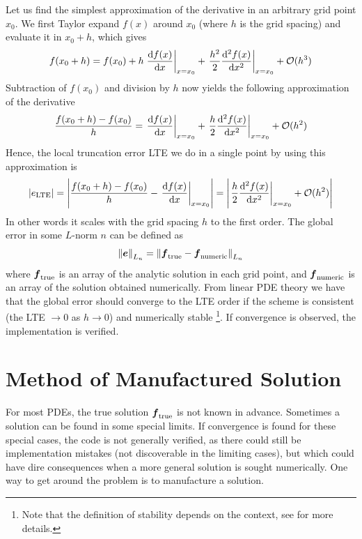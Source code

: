 Let us find the simplest approximation of the derivative in an arbitrary grid point $x_0$.
We first Taylor expand $f(x)$ around $x_0$ (where $h$ is the grid spacing) and evaluate it in $x_0 + h$, which gives
%
\begin{align*}
    f(x_0+h)
    = f(x_0)
    + h \left.\frac{\text{d}{f(x)}}{\text{d}{x}}\right|_{x=x_0}
    + \left.\frac{h^2}{2}\frac{\text{d}{^2f(x)}}{\text{d}{x^2}}\right|_{x=x_0}
    + \mathcal{O}(h^3)
\end{align*}
%
Subtraction of $f(x_0)$ and division by $h$ now yields the following approximation of the derivative
%
\begin{align*}
    \frac{f(x_0+h) - f(x_0)}{h}
    =  \left.\frac{\text{d}{f(x)}}{\text{d}{x}}\right|_{x=x_0}
    + \left.\frac{h}{2}\frac{\text{d}{^2f(x)}}{\text{d}{x^2}}\right|_{x=x_0}
    + \mathcal{O}(h^2)
\end{align*}
%
Hence, the local truncation error LTE we do in a single point by using this approximation is
%
\begin{align*}
    |e_{\text{LTE}}|
    =
    \left|\frac{f(x_0+h) - f(x_0)}{h} - \left.\frac{\text{d}{f(x)}}{\text{d}{x}}\right|_{x=x_0}\right|
    =
    \left| \left.\frac{h}{2}\frac{\text{d}{^2f(x)}}{\text{d}{x^2}}\right|_{x=x_0}
    + \mathcal{O}(h^2)\right|
\end{align*}
%
In other words it scales with the grid spacing $h$ to the first order.
The global error in some $L$-norm $n$ can be defined as
%
\begin{align*}
    \left\|\boldsymbol{e}\right\|_{L_n} =
    \left\|\boldsymbol{f}_{\text{true}} - \boldsymbol{f}_{\text{numeric}}\right\|_{L_n}
\end{align*}
%
where $\boldsymbol{f}_{\text{true}}$ is an array of the analytic solution in each grid point, and $\boldsymbol{f}_{\text{numeric}}$ is an array of the solution obtained numerically.
From linear PDE theory we have that the global error should converge to the LTE order if the scheme is consistent (the LTE $\to 0$ as $h\to 0$) and numerically stable%
\footnote{Note that the definition of stability depends on the context, see \cite{Leveque2007book} for more details.}.
%
If convergence is observed, the implementation is verified.

\section{Method of Manufactured Solution}
\label{sec:MMS}
For most PDEs, the true solution $\boldsymbol{f}_{\text{true}}$ is not known in advance.
Sometimes a solution can be found in some special limits.
If convergence is found for these special cases, the code is not generally verified, as there could still be implementation mistakes (not discoverable in the limiting cases), but which could have dire consequences when a more general solution is sought numerically.
One way to get around the problem is to manufacture a solution.

